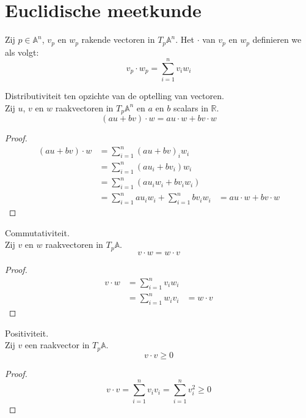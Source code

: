 \documentclass[main.tex]{subfiles}
\begin{document}
\chapter{Euclidische meetkunde}
\label{cha:euclidische-meetkunde}

\begin{de}
  Zij $p\in\mathbb{A}^{n}$, $v_{p}$ en $w_{p}$ rakende vectoren in $T_{p}\mathbb{A}^{n}$.
  Het  $\cdot$ van $v_{p}$ en $w_{p}$ definieren we als volgt:
  \[ v_{p} \cdot w_{p} = \sum_{i=1}^{n}v_{i}w_{i} \]
\end{de}

\begin{ei}
  Distributiviteit ten opzichte van de optelling van vectoren.\\
  Zij $u$, $v$ en $w$ raakvectoren in $T_{p}\mathbb{A}^{n}$ en $a$ en $b$ scalars in $\mathbb{R}$.
  \[ (au + bv) \cdot w = au\cdot w + bv \cdot w \]

  \begin{proof}
    \[
    \begin{array}{rll}
      (au + bv) \cdot w &= \sum_{i=1}^{n}(au + bv)_{i}w_{i} &\\
                        &= \sum_{i=1}^{n}(au_{i} + bv_{i})w_{i} &\\
                        &= \sum_{i=1}^{n}(au_{i}w_{i} + bv_{i}w_{i}) &\\
                        &= \sum_{i=1}^{n}au_{i}w_{i} + \sum_{i=1}^{n}bv_{i}w_{i} &= au\cdot w + bv \cdot w
    \end{array}
    \]
  \end{proof}
\end{ei}

\begin{ei}
  Commutativiteit.\\
  Zij $v$ en $w$ raakvectoren in $T_{p}\mathbb{A}$.
  \[ v\cdot w = w\cdot v\]
  \begin{proof}
    \[ 
    \begin{array}{rll}
      v\cdot w &= \sum_{i=1}^{n}v_{i}w_{i} &\\
               &= \sum_{i=1}^{n}w_{i}v_{i} &= w \cdot v
    \end{array}
    \]
  \end{proof}
\end{ei}

\begin{ei}
  Positiviteit.\\
  Zij $v$ een raakvector in $T_{p}\mathbb{A}$.
  \[ v \cdot v \ge 0 \]

  \begin{proof}
    \[
    v \cdot v =  \sum_{i=1}^{n}v_{i}v_{i} = \sum_{i=1}^{n}v_{i}^{2} \ge 0
    \]
  \end{proof}
\end{ei}
\end{document}
